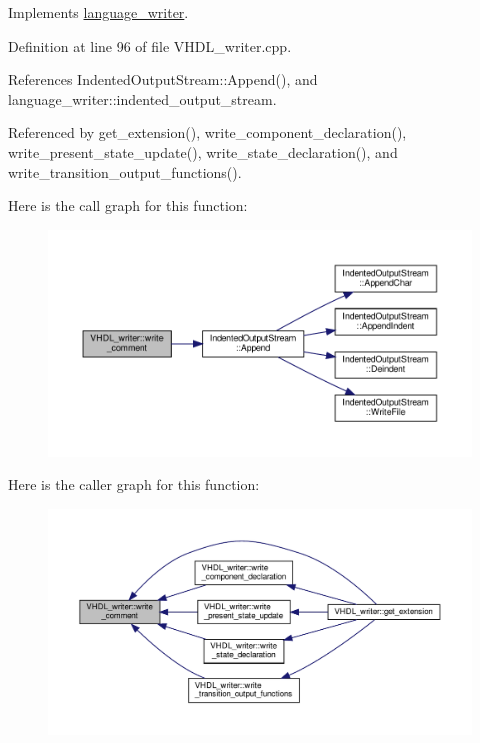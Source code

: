 Implements \hyperlink{classlanguage__writer_acb35eb2c22883fcf1f479a091dc4429d}{language\+\_\+writer}.



Definition at line 96 of file V\+H\+D\+L\+\_\+writer.\+cpp.



References Indented\+Output\+Stream\+::\+Append(), and language\+\_\+writer\+::indented\+\_\+output\+\_\+stream.



Referenced by get\+\_\+extension(), write\+\_\+component\+\_\+declaration(), write\+\_\+present\+\_\+state\+\_\+update(), write\+\_\+state\+\_\+declaration(), and write\+\_\+transition\+\_\+output\+\_\+functions().

Here is the call graph for this function\+:
\nopagebreak
\begin{figure}[H]
\begin{center}
\leavevmode
\includegraphics[width=350pt]{d0/d0c/structVHDL__writer_a9e5dd9daf73ae7621fd861dd1ad81f41_cgraph}
\end{center}
\end{figure}
Here is the caller graph for this function\+:
\nopagebreak
\begin{figure}[H]
\begin{center}
\leavevmode
\includegraphics[width=350pt]{d0/d0c/structVHDL__writer_a9e5dd9daf73ae7621fd861dd1ad81f41_icgraph}
\end{center}
\end{figure}
\mbox{\label{structVHDL__writer_a34dbb60f7e32cdaab7b617f5cb5d9943}} 
